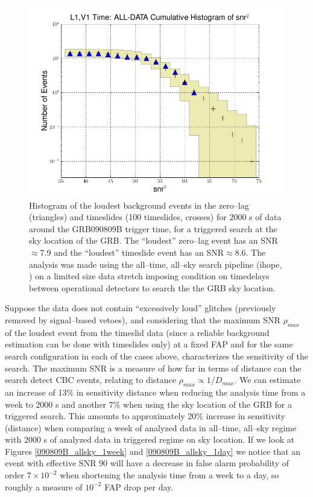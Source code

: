 \begin{itemize}
\begin{figure}[ht!]
\centering
\includegraphics[scale=0.55]{Images/090809B_directed_2000s.png}
\caption{Histogram of the loudest background events in the zero--lag (triangles) and timeslides (100 timeslides, crosses) for 2000 s of data around the GRB090809B trigger time, for a triggered search at the sky location of the GRB. The ``loudest'' zero--lag event has an SNR$\approx$7.9 and the ``loudest'' timeslide event has an SNR$\approx$8.6. The analysis was made using the all--time, all--sky search pipeline (ihope, \cite{Abadie:2010yb, Colaboration:2011nz}) on a limited size data stretch imposing condition on timedelays between operational detectors to search the the GRB sky location.}
\label{090809B_directed_2000s}
\end{figure}

\end{itemize}

Suppose the data does not contain ``excessively loud'' glitches (previously removed by signal--based vetoes), and considering that the maximum SNR $\rho_{max}$ of the loudest event from the timeslid data (since a reliable background estimation can be done with timeslides only) at a fixed FAP and for the same search configuration in each of the cases above, characterizes the sensitivity of the search. The maximum SNR is a measure of how far in terms of distance can the search detect CBC events, relating to distance $\rho_{max} \propto 1/D_{max}$. We can estimate an increase of 13\% in sensitivity distance when reducing the analysis time from a week to 2000 s and another 7\% when using the sky location of the GRB for a triggered search. This amounts to approximately 20\% increase in sensitivity (distance) when comparing a week of analyzed data in all--time, all--sky regime with 2000 s of analyzed data in triggered regime on sky location. If we look at Figures \ref{090809B_allsky_1week} and \ref{090809B_allsky_1day} we notice that an event with effective SNR 90 will have a decrease in false alarm probability of order $7 \times 10^{-2}$ when shortening the analysis time from a week to a day, so roughly a measure of $10^{-2}$ FAP drop per day.

